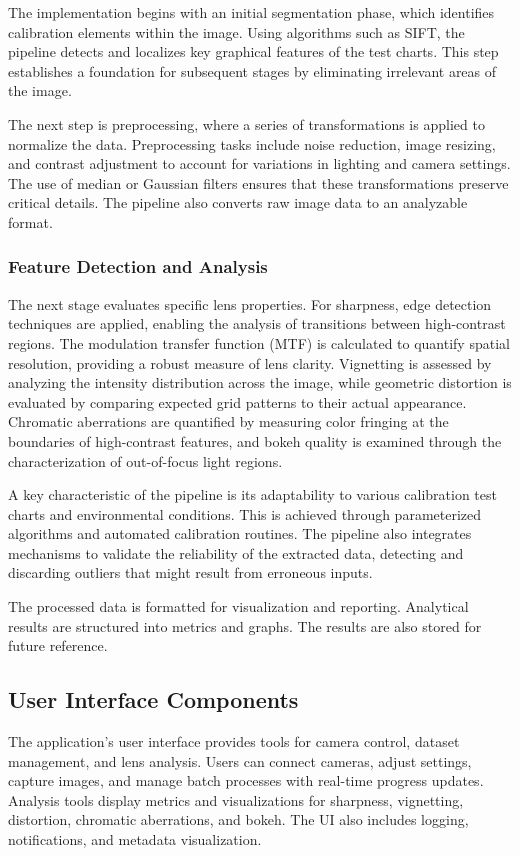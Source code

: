 The implementation begins with an initial segmentation phase, which identifies calibration elements within the image. Using algorithms such as SIFT, the pipeline detects and localizes key graphical features of the test charts. This step establishes a foundation for subsequent stages by eliminating irrelevant areas of the image.

The next step is preprocessing, where a series of transformations is applied to normalize the data. Preprocessing tasks include noise reduction, image resizing, and contrast adjustment to account for variations in lighting and camera settings. The use of median or Gaussian filters ensures that these transformations preserve critical details. The pipeline also converts raw image data to an analyzable format.

\subsubsection{Feature Detection and Analysis}

The next stage evaluates specific lens properties. For sharpness, edge detection techniques are applied, enabling the analysis of transitions between high-contrast regions. The modulation transfer function (MTF) is calculated to quantify spatial resolution, providing a robust measure of lens clarity. Vignetting is assessed by analyzing the intensity distribution across the image, while geometric distortion is evaluated by comparing expected grid patterns to their actual appearance. Chromatic aberrations are quantified by measuring color fringing at the boundaries of high-contrast features, and bokeh quality is examined through the characterization of out-of-focus light regions.

A key characteristic of the pipeline is its adaptability to various calibration test charts and environmental conditions. This is achieved through parameterized algorithms and automated calibration routines. The pipeline also integrates mechanisms to validate the reliability of the extracted data, detecting and discarding outliers that might result from erroneous inputs.

The processed data is formatted for visualization and reporting. Analytical results are structured into metrics and graphs. The results are also stored for future reference.

\subsection{User Interface Components}
The application’s user interface provides tools for camera control, dataset management, and lens analysis. Users can connect cameras, adjust settings, capture images, and manage batch processes with real-time progress updates. Analysis tools display metrics and visualizations for sharpness, vignetting, distortion, chromatic aberrations, and bokeh. The UI also includes logging, notifications, and metadata visualization.


